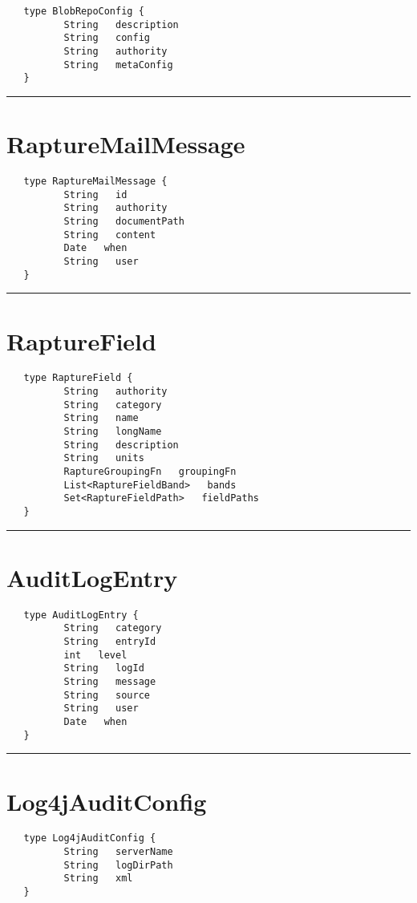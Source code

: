 \begin{verbatim}
   type BlobRepoConfig {
          String   description
          String   config
          String   authority
          String   metaConfig
   }
\end{verbatim}

\rule{15cm}{2pt}
\section{RaptureMailMessage}
\label{type:RaptureMailMessage}

\begin{verbatim}
   type RaptureMailMessage {
          String   id
          String   authority
          String   documentPath
          String   content
          Date   when
          String   user
   }
\end{verbatim}

\rule{15cm}{2pt}
\section{RaptureField}
\label{type:RaptureField}

\begin{verbatim}
   type RaptureField {
          String   authority
          String   category
          String   name
          String   longName
          String   description
          String   units
          RaptureGroupingFn   groupingFn
          List<RaptureFieldBand>   bands
          Set<RaptureFieldPath>   fieldPaths
   }
\end{verbatim}

\rule{15cm}{2pt}
\section{AuditLogEntry}
\label{type:AuditLogEntry}

\begin{verbatim}
   type AuditLogEntry {
          String   category
          String   entryId
          int   level
          String   logId
          String   message
          String   source
          String   user
          Date   when
   }
\end{verbatim}

\rule{15cm}{2pt}
\section{Log4jAuditConfig}
\label{type:Log4jAuditConfig}

\begin{verbatim}
   type Log4jAuditConfig {
          String   serverName
          String   logDirPath
          String   xml
   }
\end{verbatim}

